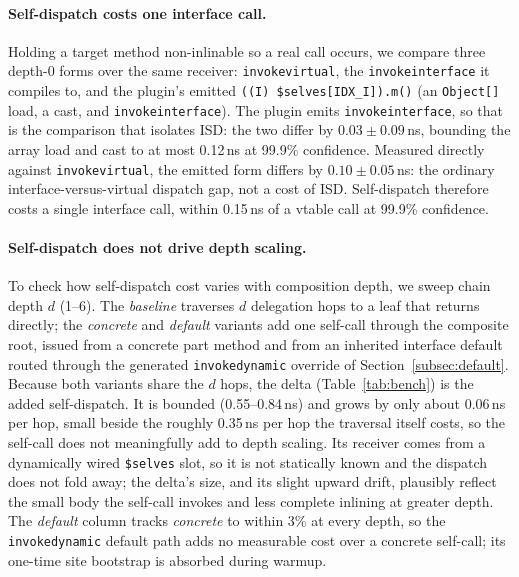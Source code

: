 \documentclass[acmsmall,nonacm]{acmart}
\theoremstyle{acmplain}
\newcommand{\code}[1]{\texttt{#1}}
\begin{document}
\paragraph{Self-dispatch costs one interface call.}
Holding a target method non-inlinable so a real call occurs, we compare three
depth-0 forms over the same receiver: \code{invokevirtual}, the
\code{invokeinterface} it compiles to, and the plugin's emitted
\code{((I)\,\$selves[IDX\_I]).m()} (an \code{Object[]} load, a cast, and
\code{invokeinterface}). The plugin emits \code{invokeinterface}, so that is the
comparison that isolates ISD: the two differ by $0.03\pm0.09$\,ns, bounding the
array load and cast to at most 0.12\,ns at 99.9\% confidence.
Measured directly against \code{invokevirtual}, the emitted form differs by
$0.10\pm0.05$\,ns: the ordinary interface-versus-virtual dispatch gap, not a cost
of ISD. Self-dispatch therefore costs a single interface call, within 0.15\,ns of
a vtable call at 99.9\% confidence.

\paragraph{Self-dispatch does not drive depth scaling.}
To check how self-dispatch cost varies with composition depth, we sweep chain
depth $d$ (1--6). The \emph{baseline} traverses $d$ delegation hops to a leaf
that returns directly; the \emph{concrete} and \emph{default} variants add one
self-call through the composite root, issued from a concrete part method and from
an inherited interface default routed through the generated \code{invokedynamic}
override of Section~\ref{subsec:default}. Because both variants share the $d$
hops, the delta (Table~\ref{tab:bench}) is the added self-dispatch. It is bounded
(0.55--0.84\,ns) and grows by only about 0.06\,ns per hop, small beside the
roughly 0.35\,ns per hop the traversal itself costs, so the self-call does not
meaningfully add to depth scaling. Its receiver comes from a dynamically wired
\code{\$selves} slot, so it is not statically known and the dispatch does not
fold away; the delta's size, and its slight upward drift, plausibly reflect the
small body the self-call invokes and less complete inlining at greater depth. The
\emph{default} column tracks \emph{concrete} to within 3\% at every depth, so the
\code{invokedynamic} default path adds no measurable cost over a concrete
self-call; its one-time site bootstrap is absorbed during warmup.
\end{document}
